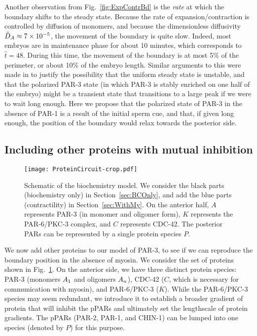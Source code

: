 \documentclass[11pt]{article}
\newcommand{\red}[1]{\color{red}#1\normalcolor}
\newcommand{\6}[1]{#1_{\text{6}}}
\newcommand{\3}[1]{#1_{\text{3}}}
\begin{document}
Another observation from Fig.\ \ref{fig:ExpContrBd} is the \emph{rate} at which the boundary shifts to the steady state. Because the rate of expansion/contraction is controlled by diffusion of monomers, and because the dimensionless diffusivity $\hat{D}_A \approx 7 \times 10^{-5}$,  the movement of the boundary is quite slow. Indeed, most embryos are in maintenance phase for about 10 minutes, which corresponds to $\hat t = 48$. During this time, the movement of the boundary is at most 5\% of the perimeter, or about 10\% of the embryo length. \red{Similar arguments to this were made in \cite{lang2022oligomerization} to justify the possibility that the uniform steady state is unstable, and that the polarized PAR-3 state (in which PAR-3 is stably enriched on one half of the embryo) \cite{lang2023oligomerization} might be a transient state that transitions to a large peak if we were to wait long enough. Here we propose that the polarized state of PAR-3 in the absence of PAR-1 is a result of the initial sperm cue, and that, if given long enough, the position of the boundary would relax towards the posterior side. }

\subsection{Including other proteins with mutual inhibition \label{sec:BCOnly}}
\begin{figure}
\centering
\texttt{[image: ProteinCircuit-crop.pdf]}
\caption{\label{fig:ModelSch}Schematic of the biochemistry model. We consider the black parts (biochemistry only) in Section\ \ref{sec:BCOnly}, and add the blue parts (contractility) in Section\ \ref{sec:WithMy}. On the anterior half, $A$ represents PAR-3 (in monomer and oligomer form), $K$ represents the PAR-6/PKC-3 complex, and $C$ represents CDC-42. The posterior PARs can be represented by a single protein species $P$.}
\end{figure}

We now add other proteins to our model of PAR-3, to see if we can reproduce the boundary position in the absence of myosin. We consider the set of proteins shown in Fig.\ \ref{fig:ModelSch}. On the anterior side, we have three distinct protein species: PAR-3 (monomers $A_1$ and oligomers $A_n$), CDC-42 ($C$, which is necessary for communication with myosin), and PAR-6/PKC-3 ($K$). While the PAR-6/PKC-3 species may seem redundant, we introduce it to establish a broader gradient of protein that will inhibit the pPARs and ultimately set the lengthscale of protein gradients. The pPARs (PAR-2, PAR-1, and CHIN-1) can be lumped into one species (denoted by $P$) for this purpose.
\end{document}
